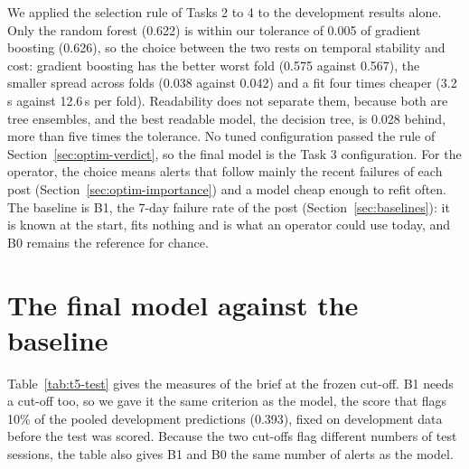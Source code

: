 \documentclass[12pt,a4paper,openany]{report}
\begin{document}
We applied the selection rule of Tasks 2 to 4 to the development results alone. Only the random forest (0.622)
is within our tolerance of 0.005 of gradient boosting (0.626), so the choice between the two rests on temporal
stability and cost: gradient boosting has the better worst fold (0.575 against 0.567), the smaller spread across
folds (0.038 against 0.042) and a fit four times cheaper (3.2\,s against 12.6\,s per fold). Readability does not
separate them, because both are tree ensembles, and the best readable model, the decision tree, is 0.028 behind,
more than five times the tolerance. No tuned configuration passed the rule of Section~\ref{sec:optim-verdict}, so the
final model is the Task 3 configuration. For the operator, the choice means alerts that follow mainly the recent
failures of each post (Section~\ref{sec:optim-importance}) and a model cheap enough to refit often. The baseline is B1, the 7-day failure rate of the post
(Section~\ref{sec:baselines}): it is known at the start, fits nothing and is what an operator could use today, and B0
remains the reference for chance.

\section{The final model against the baseline}\label{sec:t5-test}

Table~\ref{tab:t5-test} gives the measures of the brief at the frozen cut-off. B1 needs a cut-off too, so we gave
it the same criterion as the model, the score that flags 10\% of the pooled development predictions (0.393), fixed
on development data before the test was scored. Because the two cut-offs flag different numbers of test sessions,
the table also gives B1 and B0 the same number of alerts as the model.
\end{document}
